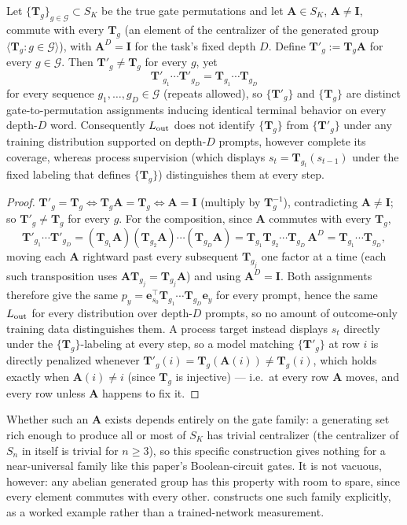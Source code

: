 \begin{theorem}
\label{thm:group-symmetry-nonidentifiability}
Let $\{\bm{T}_g\}_{g\in\mathcal G}\subset S_K$ be the true gate permutations
and let $\bm A\in S_K$, $\bm A\ne\bm I$, commute with every $\bm T_g$ (an
element of the centralizer of the generated group
$\langle\bm T_g:g\in\mathcal G\rangle$), with $\bm A^D=\bm I$ for the task's
fixed depth $D$. Define $\bm T'_g:=\bm T_g\bm A$ for every $g\in\mathcal G$.
Then $\bm T'_g\ne\bm T_g$ for every $g$, yet
\[
 \bm T'_{g_1}\cdots\bm T'_{g_D}=\bm T_{g_1}\cdots\bm T_{g_D}
\]
for every sequence $g_1,\ldots,g_D\in\mathcal G$ (repeats allowed), so
$\{\bm T'_g\}$ and $\{\bm T_g\}$ are distinct gate-to-permutation
assignments inducing identical terminal behavior on every depth-$D$ word.
Consequently $L_{\rm out}$ does not identify $\{\bm T_g\}$ from
$\{\bm T'_g\}$ under any training distribution supported on depth-$D$
prompts, however complete its coverage, whereas process supervision (which
displays $s_t=\bm T_{g_t}(s_{t-1})$ under the fixed labeling that defines
$\{\bm T_g\}$) distinguishes them at every step.
\end{theorem}
\begin{proof}
$\bm T'_g=\bm T_g\iff\bm T_g\bm A=\bm T_g\iff\bm A=\bm I$ (multiply by
$\bm T_g^{-1}$), contradicting $\bm A\ne\bm I$; so $\bm T'_g\ne\bm T_g$ for
every $g$. For the composition, since $\bm A$ commutes with every $\bm T_g$,
\[
 \bm T'_{g_1}\cdots\bm T'_{g_D}
 =(\bm T_{g_1}\bm A)(\bm T_{g_2}\bm A)\cdots(\bm T_{g_D}\bm A)
 =\bm T_{g_1}\bm T_{g_2}\cdots\bm T_{g_D}\,\bm A^D
 =\bm T_{g_1}\cdots\bm T_{g_D},
\]
moving each $\bm A$ rightward past every subsequent $\bm T_{g_j}$ one
factor at a time (each such transposition uses
$\bm A\bm T_{g_j}=\bm T_{g_j}\bm A$) and using $\bm A^D=\bm I$. Both
assignments therefore give the same $p_y=\bm e_{s_0}^\top\bm T_{g_1}\cdots
\bm T_{g_D}\bm e_y$ for every prompt, hence the same $L_{\rm out}$ for every
distribution over depth-$D$ prompts, so no amount of outcome-only training
data distinguishes them. A process target instead displays $s_t$ directly
under the $\{\bm T_g\}$-labeling at every step, so a model matching
$\{\bm T'_g\}$ at row $i$ is directly penalized whenever
$\bm T'_g(i)=\bm T_g(\bm A(i))\ne\bm T_g(i)$, which holds exactly when
$\bm A(i)\ne i$ (since $\bm T_g$ is injective) --- i.e.\ at every row $\bm A$
moves, and every row unless $\bm A$ happens to fix it.
\end{proof}

Whether such an $\bm A$ exists depends entirely on the gate family: a
generating set rich enough to produce all or most of $S_K$ has trivial
centralizer (the centralizer of $S_n$ in itself is trivial for $n\ge3$), so
this specific construction gives nothing for a near-universal family like
this paper's Boolean-circuit gates. It is not vacuous, however: any abelian
generated group has this property with room to spare, since every element
commutes with every other.  constructs one
such family explicitly, as a worked example rather than a trained-network
measurement.

